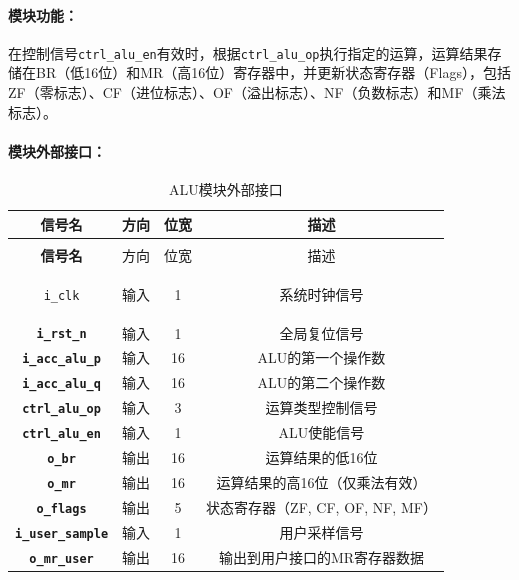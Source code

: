 \documentclass[lang=cn,a4paper,newtx]{elegantpaper}
\begin{document}
\paragraph{模块功能：}
在控制信号\texttt{ctrl\_alu\_en}有效时，根据\texttt{ctrl\_alu\_op}执行指定的运算，运算结果存储在BR（低16位）和MR（高16位）寄存器中，并更新状态寄存器（Flags），包括ZF（零标志）、CF（进位标志）、OF（溢出标志）、NF（负数标志）和MF（乘法标志）。

\paragraph{模块外部接口：}
\begin{longtable}{>{\bfseries}c c c c}
  \caption{ALU模块外部接口} \\ 
  \toprule
  信号名 & 方向 & 位宽 & 描述 \\ 
  \midrule
  \endfirsthead

  \multicolumn{4}{l}{\textbf{（续表）ALU模块外部接口}} \\ 
  \toprule
  信号名 & 方向 & 位宽 & 描述 \\ 
  \midrule
  \endhead

  \texttt{i\_clk} & 输入 & 1 & 系统时钟信号 \\ 
  \texttt{i\_rst\_n} & 输入 & 1 & 全局复位信号 \\ 
  \texttt{i\_acc\_alu\_p} & 输入 & 16 & ALU的第一个操作数 \\ 
  \texttt{i\_acc\_alu\_q} & 输入 & 16 & ALU的第二个操作数 \\ 
  \texttt{ctrl\_alu\_op} & 输入 & 3 & 运算类型控制信号 \\ 
  \texttt{ctrl\_alu\_en} & 输入 & 1 & ALU使能信号 \\ 
  \texttt{o\_br} & 输出 & 16 & 运算结果的低16位 \\ 
  \texttt{o\_mr} & 输出 & 16 & 运算结果的高16位（仅乘法有效） \\ 
  \texttt{o\_flags} & 输出 & 5 & 状态寄存器（ZF, CF, OF, NF, MF） \\ 
  \texttt{i\_user\_sample} & 输入 & 1 & 用户采样信号 \\ 
  \texttt{o\_mr\_user} & 输出 & 16 & 输出到用户接口的MR寄存器数据 \\ 
  \bottomrule
\end{longtable}
\end{document}
